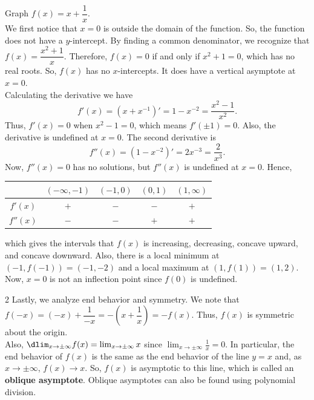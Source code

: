 \documentclass{book}
\begin{document}
\begin{Exam} Graph $f(x) = x + \dfrac{1}{x}$.\\

We first notice that $x=0$ is outside the domain of the function. So, the function does not have a $y$-intercept. By finding a common denominator, we recognize that $f(x) = \dfrac{x^2+1}{x}$. Therefore, $f(x) = 0$ if and only if $x^2+1 = 0$, which has no real roots. So, $f(x)$ has no $x$-intercepts. It does  have a vertical asymptote at $x = 0$. \\

Calculating the derivative we have \[f'(x) = (x+x^{-1})' = 1 - x^{-2} = \dfrac{x^2-1}{x^2}.\] Thus, $f'(x) = 0$ when $x^2-1=0$, which means $f'(\pm1) = 0$. Also, the derivative is undefined at $x=0$. The second derivative is \[f''(x) = (1-x^{-2})' = 2x^{-3} = \dfrac{2}{x^3}.\] Now, $f''(x) = 0$ has no solutions, but $f''(x)$ is undefined at $x=0$. Hence,
\begin{center}
\begin{tabular}{c|c|c|c|c}
 & $\left(-\infty, -1\right)$ & $\left(-1, 0\right)$ & $\left(0, 1\right)$ & $(1, \infty)$ \\ \hline
$f'(x)$ & $+$ & $-$ & $-$ & $+$ \\ %
$f''(x)$ & $-$ & $-$ & $+$ & $+$ \\ %
\end{tabular}
\end{center}\vspace{0.1 in} which gives the intervals that $f(x)$ is increasing, decreasing, concave upward, and concave downward. Also, there is a local minimum at $(-1, f(-1)) = (-1, -2)$ and a local maximum at $(1, f(1)) = (1,2)$. Now, $x=0$ is not an inflection point since $f(0)$ is undefined.\\

\begin{multicols}{2}
Lastly, we analyze end behavior and symmetry. We note that $f(-x) = (-x) + \dfrac{1}{-x} = -\left(x+\dfrac{1}{x}\right) = -f(x)$. Thus, $f(x)$ is symmetric about the origin.\\

 Also, $\dlim_{x\to \pm\infty} f(x) = \lim_{x\to \pm\infty} x$ since $\displaystyle\lim_{x\to \pm\infty} \frac{1}{x} = 0$. In particular, the end behavior of $f(x)$ is the same as the end behavior of the line $y=x$ and, as $x\to \pm\infty$, $f(x) \to x$. So, $f(x)$ is asymptotic to this line, which is called an \textbf{oblique asymptote}. Oblique asymptotes can also be found using polynomial division.\\


\end{multicols}
\end{Exam}
\end{document}
